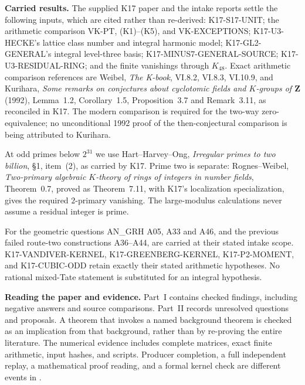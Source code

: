 \documentclass[11pt,a4paper]{article}
\theoremstyle{definition}
\renewcommand{\paragraph}[1]{\par\smallskip\noindent\textbf{#1}\quad\ignorespaces}
\begin{document}
\paragraph{Carried results.}
The supplied K17 paper and the intake reports settle the following
inputs, which are cited rather than re-derived:
K17-S17-UNIT; the arithmetic comparison VK-PT, (K1)--(K5), and
VK-EXCEPTIONS; K17-U3-HECKE's lattice class number and integral
harmonic model; K17-GL2-GENERAL's integral level-three basis;
K17-MINUS7-GENERAL-SOURCE; K17-U3-RESIDUAL-RING; and the finite
vanishings through $K_{48}$. Exact arithmetic comparison references
are Weibel, \emph{The K-book}, VI.8.2, VI.8.3, VI.10.9, and
Kurihara, \emph{Some remarks on conjectures about cyclotomic fields
and $K$-groups of $\mathbf Z$} (1992), Lemma~1.2, Corollary~1.5,
Proposition~3.7 and Remark~3.11, as reconciled in K17.
The modern comparison is required for the two-way zero-equivalence;
no unconditional 1992 proof of the then-conjectural comparison is
being attributed to Kurihara.

At odd primes below $2^{31}$ we use Hart--Harvey--Ong,
\emph{Irregular primes to two billion}, \S1, item~(2), as carried
by K17. Prime two is separate: Rognes--Weibel,
\emph{Two-primary algebraic $K$-theory of rings of integers in
number fields}, Theorem~0.7, proved as Theorem~7.11,
with K17's localization specialization, gives the required
$2$-primary vanishing. The large-modulus calculations never
assume a residual integer is prime.

For the geometric questions AN\_GRH A05, A33 and A46, and the
previous failed route-two constructions A36--A44, are carried at
their stated intake scope. K17-VANDIVER-KERNEL,
K17-GREENBERG-KERNEL, K17-P2-MOMENT, and K17-CUBIC-ODD retain
exactly their stated arithmetic hypotheses. No rational
mixed-Tate statement is substituted for an integral hypothesis.

\paragraph{Reading the paper and evidence.}
Part~I contains checked findings, including negative answers and
source comparisons. Part~II records unresolved questions and
proposals. A theorem that invokes a named background theorem is
checked as an implication from that background, rather than by
re-proving the entire literature. The numerical evidence includes
complete matrices, exact finite arithmetic, input hashes, and
scripts. Producer completion, a full independent replay, a
mathematical proof reading, and a formal kernel check are different
events in .
\end{document}

